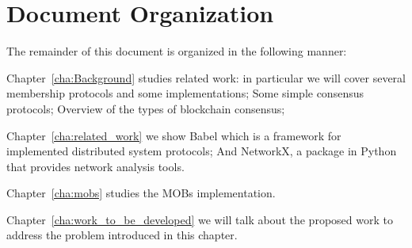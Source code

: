 \section{Document Organization}\label{sub:document_organization}

The remainder of this document is organized in the following manner:

Chapter~\ref{cha:Background} studies related work: in particular we will cover several membership protocols and some implementations;
Some simple consensus protocols; Overview of the types of blockchain consensus;


Chapter~\ref{cha:related_work} we show Babel which is a framework for implemented distributed system protocols; And NetworkX,
a package in Python that provides network analysis tools.

Chapter~\ref{cha:mobs} studies the MOBs implementation.

Chapter~\ref{cha:work_to_be_developed} we will talk about the proposed work to address the problem
introduced in this chapter.